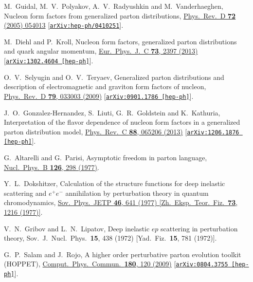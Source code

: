 \documentclass[aps,prl,reprint,groupedaddress, preprintnumbers]{revtex4-1}
\begin{document}
\begin{thebibliography}{50}
  
  M.~Guidal, M.~V.~Polyakov, A.~V.~Radyushkin and M.~Vanderhaeghen,
  Nucleon form factors from generalized parton distributions,
  \href{https://doi.org/10.1103/PhysRevD.72.054013}{Phys.\ Rev.\ D {\bf 72} (2005) 054013}
  [\href{https://arxiv.org/abs/hep-ph/0410251}{\tt arXiv:hep-ph/0410251}].
  
  
  M.~Diehl and P.~Kroll,
  Nucleon form factors, generalized parton distributions and quark angular momentum,
  \href{https://doi.org/10.1140/epjc/s2004-02063-4}{Eur.\ Phys.\ J.\ C {\bf 73}, 2397 (2013)}
  [\href{https://arxiv.org/abs/1302.4604}{\tt arXiv:1302.4604 [hep-ph]}].


  O.~V.~Selyugin and O.~V.~Teryaev,
  Generalized parton distributions and description of electromagnetic and graviton form factors of nucleon,
  \href{https://doi.org/10.1103/PhysRevD.79.033003}{Phys.\ Rev.\ D {\bf 79}, 033003 (2009)}
  [\href{https://arxiv.org/abs/0901.1786}{\tt arXiv:0901.1786 [hep-ph]}].  
  

  J.~O.~Gonzalez-Hernandez, S.~Liuti, G.~R.~Goldstein and K.~Kathuria,
  Interpretation of the flavor dependence of nucleon form factors in a generalized parton distribution model,
  \href{https://doi.org/10.1103/PhysRevC.88.065206}{Phys.\ Rev.\ C {\bf 88},  065206 (2013)}
  [\href{https://arxiv.org/abs/1206.1876}{\tt arXiv:1206.1876 [hep-ph]}].  
  
 
  G.~Altarelli and G.~Parisi,
  Asymptotic freedom in parton language,
  \href{https://doi.org/10.1016/0550-3213(77)90384-4}{Nucl.\ Phys.\ B {\bf 126}, 298 (1977)}.


  Y.~L.~Dokshitzer,
  Calculation of the structure functions for deep inelastic scattering and $e^+ e^-$ annihilation by perturbation theory in quantum chromodynamics,
  \href{http://www.jetp.ac.ru/cgi-bin/e/index/e/46/4/p641?a=list}{Sov.\ Phys.\ JETP {\bf 46}, 641 (1977)
  [Zh.\ Eksp.\ Teor.\ Fiz.\  {\bf 73}, 1216 (1977)]}.

  
  V.~N.~Gribov and L.~N.~Lipatov,
  Deep inelastic $e p$  scattering in perturbation theory,
  Sov.\ J.\ Nucl.\ Phys.\  {\bf 15}, 438 (1972)
  [Yad.\ Fiz.\  {\bf 15}, 781 (1972)].

  
  G.~P.~Salam and J.~Rojo,
  A higher order perturbative parton evolution toolkit (HOPPET),
  \href{https://doi.org/10.1016/j.cpc.2008.08.010}{Comput.\ Phys.\ Commun.\  {\bf 180}, 120 (2009)}
  [\href{https://arxiv.org/abs/0804.3755}{\tt arXiv:0804.3755 [hep-ph]}].



\end{thebibliography}
\end{document}
